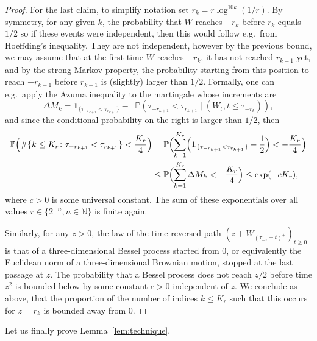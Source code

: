 \documentclass[british, a4paper,11pt]{article}
\numberwithin{equation}{section}
\theoremstyle{definition}
\renewcommand{\P}{\mathop{}\!\mathbb{P}}
\newcommand{\N}{\mathbb{N}}
\newcommand{\ind}[1]{\mathbf{1}_{\{#1\}}}
\begin{document}
\begin{proof}
For the last claim, to simplify notation set $r_{k}=r \log^{10k}(1/r)$. By symmetry, for any given $k$, the probability that $W$ reaches $-r_{k}$ before $r_{k}$ equals $1/2$ so if these events were independent, then this would follow e.g.~from Hoeffding's inequality. They are not independent, however by the previous bound, we may assume that at the first time $W$ reaches $-r_{k}$, it has not reached $r_{k+1}$ yet, and by the strong Markov property, the probability starting from this position to reach $-r_{k+1}$ before $r_{k+1}$ is (slightly) larger than $1/2$. Formally, one can e.g.~apply the Azuma inequality to the martingale whose increments are
\[
\Delta M_k = \ind{\tau_{-r_{k+1}} < \tau_{r_{k+1}}} - \P(\tau_{-r_{k+1}} < \tau_{r_{k+1}} \mid (W_t, t \leq \tau_{-r_{k}})),
\]
and since the conditional probability on the right is larger than $1/2$, then
\begin{align*}
\P\Bigl(\#\{k \leq K_r \colon \tau_{-r_{k+1}} < \tau_{r_{k+1}}\} < \frac{K_r}{4}\Bigr) & = \P\Bigl(\sum_{k=1}^{K_r} \Bigl(\ind{\tau_{-r_{k+1}} < \tau_{r_{k+1}}} - \frac{1}{2}\Bigr) < - \frac{K_r}{4}\Bigr)
\\
&  \leq \P\Bigl(\sum_{k=1}^{K_r} \Delta M_k < - \frac{K_r}{4}\Bigr) \leq \exp(- c K_r)
,\end{align*}
where $c>0$ is some universal constant.
The sum of these exponentials over all values $r \in \{2^{-n}, n \in \N\}$ is finite again.

Similarly, for any $z>0$, the law of the time-reversed path $(z+W_{(\tau_{-z}-t)^+})_{t \geq 0}$ is that of a three-dimensional Bessel process started from $0$, or equivalently the Euclidean norm of a three-dimensional Brownian motion, stopped at the last passage at $z$. The probability that a Bessel process does not reach $z/2$ before time $z^2$ is bounded below by some constant $c>0$ independent of $z$.
We conclude as above, that the proportion of the number of indices $k \leq K_r$ such that this occurs for $z = r_{k}$ is bounded away from $0$.
\end{proof}

Let us finally prove Lemma~\ref{lem:technique}.
\end{document}
